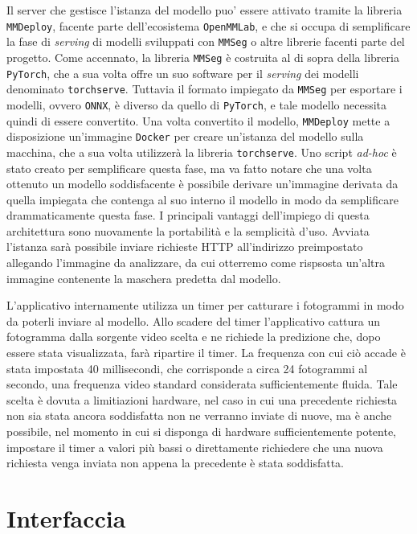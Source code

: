 Il server che gestisce l'istanza del modello puo' essere
attivato tramite la libreria {\tt MMDeploy}\cite{mmdeploy},
facente parte dell'ecosistema {\tt OpenMMLab},
e che si occupa di semplificare la fase di {\it serving}
di modelli sviluppati con {\tt MMSeg} o altre librerie
facenti parte del progetto.
Come accennato, la libreria {\tt MMSeg} è costruita
al di sopra della libreria {\tt PyTorch}, che a sua volta
offre un suo software per il {\it serving} dei modelli
denominato {\tt torchserve}.
Tuttavia il formato impiegato da {\tt MMSeg} per esportare
i modelli, ovvero {\tt ONNX}, è diverso da quello di {\tt PyTorch},
e tale modello necessita quindi di essere convertito.
Una volta convertito il modello, {\tt MMDeploy} mette a
disposizione un'immagine {\tt Docker} per creare un'istanza
del modello sulla macchina, che a sua volta utilizzerà la
libreria {\tt torchserve}.
Uno script {\it ad-hoc} è stato creato per semplificare questa
fase, ma va fatto notare che una volta ottenuto un modello
soddisfacente è possibile derivare un'immagine derivata
da quella impiegata che contenga al suo interno il modello
in modo da semplificare drammaticamente questa fase.
I principali vantaggi dell'impiego di questa architettura
sono nuovamente la portabilità e la semplicità d'uso.
Avviata l'istanza sarà possibile inviare richieste HTTP
all'indirizzo preimpostato allegando l'immagine da analizzare,
da cui otterremo come rispsosta un'altra immagine contenente
la maschera predetta dal modello.

L'applicativo internamente utilizza un timer per catturare
i fotogrammi in modo da poterli inviare al modello.
Allo scadere del timer l'applicativo cattura un fotogramma
dalla sorgente video scelta e ne richiede la predizione che,
dopo essere stata visualizzata, farà ripartire il timer.
La frequenza con cui ciò accade è stata impostata 40
millisecondi, che corrisponde a circa 24 fotogrammi al secondo,
una frequenza video standard considerata sufficientemente fluida.
Tale scelta è dovuta a limitiazioni hardware, nel caso in cui
una precedente richiesta non sia stata ancora soddisfatta
non ne verranno inviate di nuove, ma è anche possibile, nel
momento in cui si disponga di hardware sufficientemente potente,
impostare il timer a valori più bassi o direttamente richiedere
che una nuova richiesta venga inviata non appena la precedente
è stata soddisfatta.


\section{Interfaccia}

